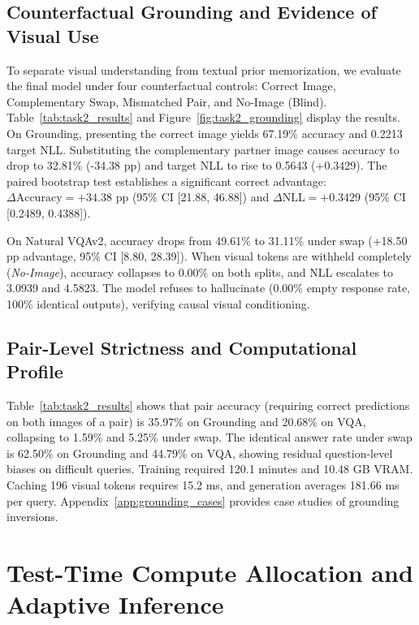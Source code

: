 \documentclass{article}
\begin{document}
\subsection{Counterfactual Grounding and Evidence of Visual Use}
To separate visual understanding from textual prior memorization, we evaluate the final model under four counterfactual controls: Correct Image, Complementary Swap, Mismatched Pair, and No-Image (Blind). Table~\ref{tab:task2_results} and Figure~\ref{fig:task2_grounding} display the results. On Grounding, presenting the correct image yields 67.19\% accuracy and 0.2213 target NLL. Substituting the complementary partner image causes accuracy to drop to 32.81\% (-34.38 pp) and target NLL to rise to 0.5643 (+0.3429). The paired bootstrap test establishes a significant correct advantage: $\Delta\mathrm{Accuracy} = +34.38\text{ pp}$ (95\% CI [21.88, 46.88]) and $\Delta\mathrm{NLL} = +0.3429$ (95\% CI [0.2489, 0.4388]).

On Natural VQAv2, accuracy drops from 49.61\% to 31.11\% under swap (+18.50 pp advantage, 95\% CI [8.80, 28.39]). When visual tokens are withheld completely (\textit{No-Image}), accuracy collapses to 0.00\% on both splits, and NLL escalates to 3.0939 and 4.5823. The model refuses to hallucinate (0.00\% empty response rate, 100\% identical outputs), verifying causal visual conditioning.

\subsection{Pair-Level Strictness and Computational Profile}
Table~\ref{tab:task2_results} shows that pair accuracy (requiring correct predictions on both images of a pair) is 35.97\% on Grounding and 20.68\% on VQA, collapsing to 1.59\% and 5.25\% under swap. The identical answer rate under swap is 62.50\% on Grounding and 44.79\% on VQA, showing residual question-level biases on difficult queries. Training required 120.1 minutes and 10.48 GB VRAM. Caching 196 visual tokens requires 15.2 ms, and generation averages 181.66 ms per query. Appendix~\ref{app:grounding_cases} provides case studies of grounding inversions.

\FloatBarrier
\section{Test-Time Compute Allocation and Adaptive Inference}
\label{sec:task3}
\end{document}
